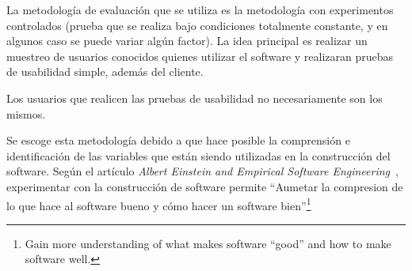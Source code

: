


La metodología de evaluación que se utiliza es la metodología con experimentos controlados (prueba que se realiza bajo condiciones totalmente constante, y en algunos caso se puede variar algún factor). La idea principal es realizar un muestreo de usuarios conocidos quienes utilizar el software y realizaran pruebas de usabilidad simple, además del cliente. 

Los usuarios que realicen las pruebas de usabilidad no necesariamente son los mismos.

Se escoge esta metodología debido a que hace posible la comprensión e identificación de las variables que están siendo utilizadas en la construcción del software. Según el artículo \emph{Albert Einstein and Empirical Software Engineering}~\cite{8}, experimentar con la construcción de software permite ``Aumetar la compresion de lo que hace al software bueno y cómo hacer un software bien''\footnote{Gain more understanding of what makes software ``good'' and how to make software well.}
